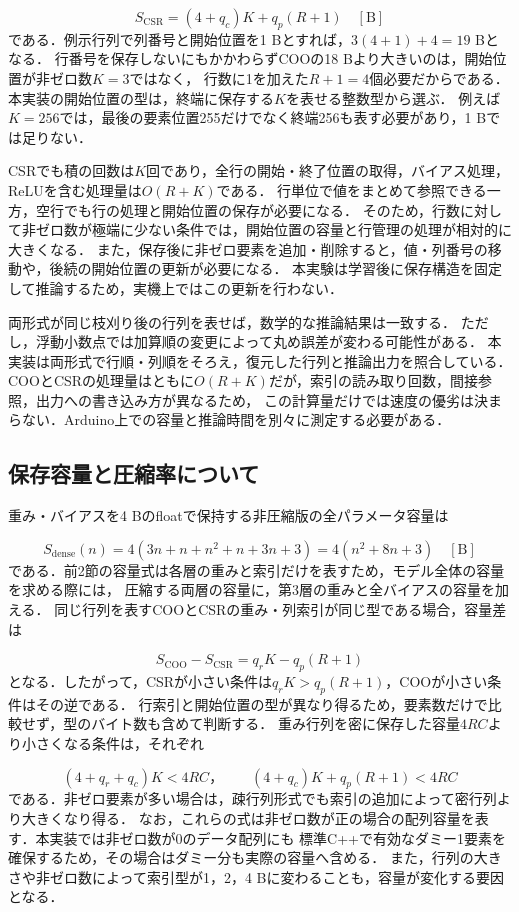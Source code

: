 \documentclass[a4paper,11pt]{article}
\begin{document}
\[
    S_{\mathrm{CSR}}=(4+q_c)K+q_p(R+1)\quad[\mathrm{B}]
\]
%
である．例示行列で列番号と開始位置を1 Bとすれば，$3(4+1)+4=19$ Bとなる．
行番号を保存しないにもかかわらずCOOの18 Bより大きいのは，開始位置が非ゼロ数$K=3$ではなく，
行数に1を加えた$R+1=4$個必要だからである．
本実装の開始位置の型は，終端に保存する$K$を表せる整数型から選ぶ．
例えば$K=256$では，最後の要素位置255だけでなく終端256も表す必要があり，1 Bでは足りない．

CSRでも積の回数は$K$回であり，全行の開始・終了位置の取得，バイアス処理，ReLUを含む処理量は$O(R+K)$である．
行単位で値をまとめて参照できる一方，空行でも行の処理と開始位置の保存が必要になる．
そのため，行数に対して非ゼロ数が極端に少ない条件では，開始位置の容量と行管理の処理が相対的に大きくなる．
また，保存後に非ゼロ要素を追加・削除すると，値・列番号の移動や，後続の開始位置の更新が必要になる．
本実験は学習後に保存構造を固定して推論するため，実機上ではこの更新を行わない．

両形式が同じ枝刈り後の行列を表せば，数学的な推論結果は一致する．
ただし，浮動小数点では加算順の変更によって丸め誤差が変わる可能性がある．
本実装は両形式で行順・列順をそろえ，復元した行列と推論出力を照合している．
COOとCSRの処理量はともに$O(R+K)$だが，索引の読み取り回数，間接参照，出力への書き込み方が異なるため，
この計算量だけでは速度の優劣は決まらない．Arduino上での容量と推論時間を別々に測定する必要がある．

\subsection{保存容量と圧縮率について}

重み・バイアスを4 Bのfloatで保持する非圧縮版の全パラメータ容量は

\[
    S_{\mathrm{dense}}(n)=4(3n+n+n^2+n+3n+3)=4(n^2+8n+3)\quad[\mathrm{B}]
\]
%
である．前2節の容量式は各層の重みと索引だけを表すため，モデル全体の容量を求める際には，
圧縮する両層の容量に，第3層の重みと全バイアスの容量を加える．
同じ行列を表すCOOとCSRの重み・列索引が同じ型である場合，容量差は

\[
    S_{\mathrm{COO}}-S_{\mathrm{CSR}}=q_rK-q_p(R+1)
\]
%
となる．したがって，CSRが小さい条件は$q_rK>q_p(R+1)$，COOが小さい条件はその逆である．
行索引と開始位置の型が異なり得るため，要素数だけで比較せず，型のバイト数も含めて判断する．
重み行列を密に保存した容量$4RC$より小さくなる条件は，それぞれ

\[
    (4+q_r+q_c)K<4RC，\qquad
    (4+q_c)K+q_p(R+1)<4RC
\]
%
である．非ゼロ要素が多い場合は，疎行列形式でも索引の追加によって密行列より大きくなり得る．
なお，これらの式は非ゼロ数が正の場合の配列容量を表す．本実装では非ゼロ数が0のデータ配列にも
標準C++で有効なダミー1要素を確保するため，その場合はダミー分も実際の容量へ含める．
また，行列の大きさや非ゼロ数によって索引型が1，2，4 Bに変わることも，容量が変化する要因となる．
\end{document}
